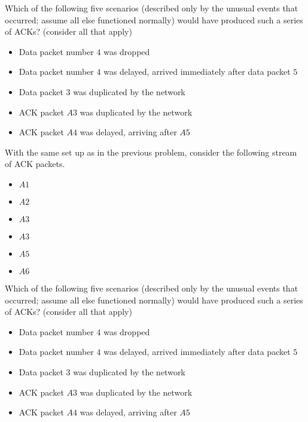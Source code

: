 \documentclass{supervision}
\begin{document}
\begin{questions}
\begin{parts}
\begin{subparts}
                Which of the following five scenarios (described only by the
                unusual events that occurred; assume all else functioned
                normally) would have produced such a series of ACKs? (consider
                all that apply)

                \begin{itemize}
                  \item Data packet number $4$ was dropped
                  \item Data packet number $4$ was delayed, arrived immediately
                  after data packet $5$
                  \item Data packet $3$ was duplicated by the network
                  \item ACK packet $A3$ was duplicated by the network
                  \item ACK packet $A4$ was delayed, arriving after $A5$
                \end{itemize}

              \subpart With the same set up as in the previous problem,
                consider the following stream of ACK packets.

                \begin{itemize}
                  \item $A1$
                  \item $A2$
                  \item $A3$
                  \item $A3$
                  \item $A5$
                  \item $A6$
                \end{itemize}

                Which of the following five scenarios (described only by the
                unusual events that occurred; assume all else functioned
                normally) would have produced such a series of ACKs? (consider
                all that apply)

                \begin{itemize}
                  \item Data packet number $4$ was dropped
                  \item Data packet number $4$ was delayed, arrived immediately
                  after data packet $5$
                  \item Data packet $3$ was duplicated by the network
                  \item ACK packet $A3$ was duplicated by the network
                  \item ACK packet $A4$ was delayed, arriving after $A5$
                \end{itemize}
            \end{subparts}
        \end{parts}


\end{questions}
\end{document}
